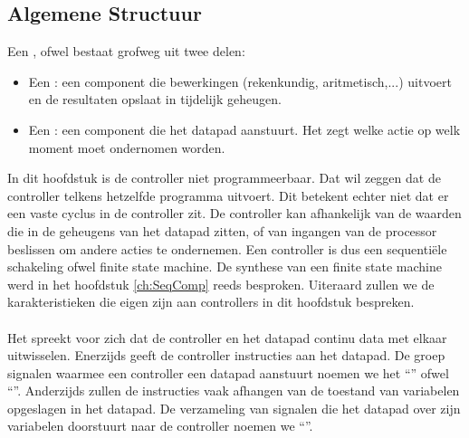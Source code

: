 \subsection{Algemene Structuur}
Een , ofwel  bestaat grofweg uit twee delen:
\begin{itemize}
 \item Een : een component die bewerkingen (rekenkundig, aritmetisch,...) uitvoert en de resultaten opslaat in tijdelijk geheugen.
 \item Een : een component die het datapad aanstuurt. Het zegt welke actie op welk moment moet ondernomen worden.
\end{itemize}
In dit hoofdstuk is de controller niet programmeerbaar. Dat wil zeggen dat de controller telkens hetzelfde programma uitvoert. Dit betekent echter niet dat er een vaste cyclus in de controller zit. De controller kan afhankelijk van de waarden die in de geheugens van het datapad zitten, of van ingangen van de processor beslissen om andere acties te ondernemen. Een controller is dus een sequenti\"ele schakeling ofwel finite state machine. De synthese van een finite state machine werd in het hoofdstuk \ref{ch:SeqComp} reeds besproken. Uiteraard zullen we de karakteristieken die eigen zijn aan controllers in dit hoofdstuk bespreken.
\paragraph{}
Het spreekt voor zich dat de controller en het datapad continu data met elkaar uitwisselen. Enerzijds geeft de controller instructies aan het datapad. De groep signalen waarmee een controller een datapad aanstuurt noemen we het ``'' ofwel ``''. Anderzijds zullen de instructies vaak afhangen van de toestand van variabelen opgeslagen in het datapad. De verzameling van signalen die het datapad over zijn variabelen doorstuurt naar de controller noemen we ``''.
